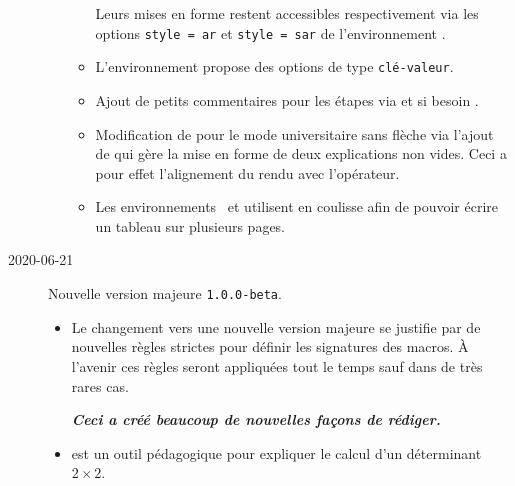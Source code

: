 \documentclass[12pt,a4paper]{book}
\begin{document}
\begin{description}
\begin{itemize}[itemsep=.5em]
\begin{itemize}[itemsep=.5em]
                  \smallskip
    
                  Leurs mises en forme restent accessibles respectivement via les options \verb+style = ar+ et \verb+style = sar+ de l'environnement .
    
    
            \item L'environnement  propose des options de type \texttt{clé-valeur}.
    
    
            \item Ajout de petits commentaires pour les étapes via  et si besoin .
    
    
            \item Modification de  pour le mode universitaire sans flèche via l'ajout de  qui gère la mise en forme de deux explications non vides.
                  Ceci a pour effet l'alignement du rendu avec l'opérateur.
    
    
            \item Les environnements  et  utilisent  en coulisse afin de pouvoir écrire un tableau sur plusieurs pages.
        \end{itemize}
    \end{itemize}


    \medskip
    \item[2020-06-21] Nouvelle version majeure \verb+1.0.0-beta+.
    
    \begin{itemize}[itemsep=.5em]
        \item Le changement vers une nouvelle version majeure se justifie par de nouvelles règles strictes pour définir les signatures des macros. À l'avenir ces règles seront appliquées tout le temps sauf dans de très rares cas.
        \begin{center}
    		\bfseries\itshape
    		Ceci a créé beaucoup de nouvelles façons de rédiger.
        \end{center}
    
    
    
    
    
        \separation
        \item {}
               est un outil pédagogique pour expliquer le calcul d'un déterminant $2\times2$.
    

\end{itemize}
\end{description}
\end{document}
